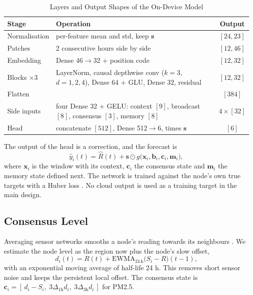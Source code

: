 \documentclass[journal]{IEEEtran}
\begin{document}
\begin{table}[!htb]
\caption{Layers and Output Shapes of the On-Device Model}
\label{tab:layers}
\centering\footnotesize
\setlength{\tabcolsep}{3pt}
\begin{tabular}{|p{1.5cm}|p{4.5cm}|c|}
\hline
Stage & Operation & Output \\
\hline
Normalisation & per-feature mean and std, keep $\mathbf{s}$ & $[24,23]$ \\
Patches & 2 consecutive hours side by side & $[12,46]$ \\
Embedding & Dense 46$\to$32 + position code & $[12,32]$ \\
Blocks $\times3$ & LayerNorm, causal depthwise conv ($k{=}3$, $d{=}1,2,4$), Dense 64 + GLU, Dense 32, residual & $[12,32]$ \\
Flatten & & $[384]$ \\
Side inputs & four Dense 32 + GELU: context $[9]$, broadcast $[8]$, consensus $[3]$, memory $[8]$ & $4\times[32]$ \\
Head & concatenate $[512]$, Dense 512$\to$6, times $\mathbf{s}$ & $[6]$ \\
\hline
\end{tabular}
\end{table}

The output of the head is a correction, and the forecast is
\begin{equation}
\hat y_i(t) = \hat R(t) + \mathbf{s}\odot g\big(\mathbf{x}_i,\mathbf{b}_i,\mathbf{c}_i,\mathbf{m}_i\big),
\label{eq:split}
\end{equation}
where $\mathbf{x}_i$ is the window with its context, $\mathbf{c}_i$ the consensus state and $\mathbf{m}_i$ the memory state defined next. The network is trained against the node's own true targets with a Huber loss \cite{huber1964robust}. No cloud output is used as a training target in the main design.

\subsection{Consensus Level}
Averaging sensor networks smooths a node's reading towards its neighbours \cite{olfati2007consensus}. We estimate the node level as the region now plus the node's slow offset,
\begin{equation}
d_i(t) = R(t) + \mathrm{EWMA}_{24\,\mathrm{h}}\big(S_i - R\big)(t-1),
\label{eq:consensus}
\end{equation}
with an exponential moving average of half-life 24 h. This removes short sensor noise and keeps the persistent local offset. The consensus state is $\mathbf{c}_i=[\,d_i-S_i,\;3\Delta_{1\mathrm{h}}d_i,\;3\Delta_{3\mathrm{h}}d_i\,]$ for PM2.5.
\end{document}
